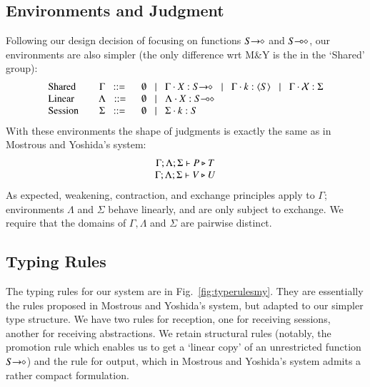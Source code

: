 \subsection{Environments and Judgment}
Following our design decision of focusing on functions $S\!\! \rightarrow\!\! \diamond$ and $S\!\! \multimap\!\! \diamond$,
our environments are also simpler (the only difference wrt M\&Y is the in the `Shared' group):
\[
	\begin{array}{lcl}
		\text{Shared} & \Gamma \bnfis & \emptyset \bnfbar \Gamma \cat \varp{X}: \shot{S} \bnfbar \Gamma \cat k: \chtype{S} \bnfbar \Gamma \cat \rvar{X}: \Sigma \\
		\text{Linear} & \Lambda \bnfis & \emptyset \bnfbar \Lambda \cat \varp{X}: \lhot{S}  \\
		\text{Session} \quad & \Sigma \bnfis & \emptyset \bnfbar \Sigma \cat k:S  
	\end{array}
\]
With these environments the shape of judgments is exactly the same as in Mostrous and Yoshida's system:
\[
	\begin{array}{c}
		\Gamma; \Lambda ; \Sigma \vdash P \triangleright T\\
		\Gamma; \Lambda; \Sigma \vdash V \triangleright U
	\end{array}
\]
As expected, weakening, contraction, and exchange principles apply to $\Gamma$;
environments $\Lambda$ and $\Sigma$ behave linearly, and are only subject to exchange.
We require that the domains of $\Gamma, \Lambda$ and $\Sigma$ are pairwise distinct.

\subsection{Typing Rules}

\newcommand{\jrule}[3]{\displaystyle \trule{#3}~~\frac{#1 }{#2}}
\newcommand{\addenv}{\circ}

The typing rules for our system are in Fig.~\ref{fig:typerulesmy}. 
They are essentially the rules proposed in Mostrous and Yoshida's system, but adapted to our simpler type structure.
We have two rules for reception, one for receiving sessions, another for receiving abstractions. 
We retain structural rules (notably, the promotion rule which enables us to get a `linear copy' of 
an unrestricted function $S\!\! \rightarrow\!\! \diamond$) and the rule for output, which in Mostrous and Yoshida's system admits a rather compact formulation.

